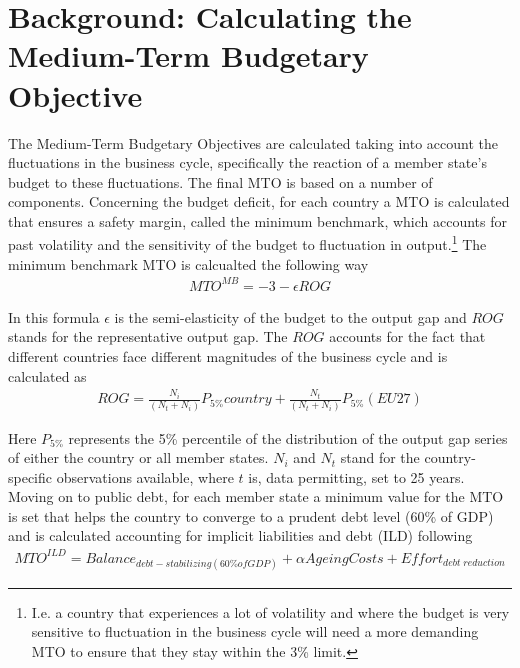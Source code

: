 \documentclass{tufte-handout}
\begin{document}
\section{Background: Calculating the Medium-Term Budgetary Objective}
The Medium-Term Budgetary Objectives are calculated taking into account the fluctuations in the business cycle, specifically the reaction of a member state's budget to these fluctuations. 
The final MTO is based on a number of components.
Concerning the budget deficit, for each country a MTO is calculated that ensures a safety margin, called the minimum benchmark, which accounts for past volatility and the sensitivity of the budget to fluctuation in output.\footnote{I.e. a country that experiences a lot of volatility and where the budget is very sensitive to fluctuation in the business cycle will need a more demanding MTO to ensure that they stay within the 3\% limit. } 
The minimum benchmark MTO is calcualted the following way
\begin{align*}
  MTO^{MB} = -3 -\epsilon ROG
\end{align*}

In this formula $\epsilon$ is the semi-elasticity of the budget to the output gap and $ROG$ stands for the representative output gap. 
The $ROG$ accounts for the fact that different countries face different magnitudes of the business cycle and is calculated as
\begin{align*}
  ROG = \frac{N_i}{(N_t+N_i)}P_{5\%}country + \frac{N_t}{(N_t+N_i)}P_{5\%}(EU27)
\end{align*}

Here $P_{5\%}$ represents the 5\% percentile of the distribution of the output gap series of either the country or all member states. 
$N_i$ and $N_t$ stand for the country-specific observations available, where $t$ is, data permitting, set to 25 years. 
Moving on to public debt, for each member state a minimum value for the MTO is set that helps the country to converge to a prudent debt level (60\% of GDP) and is calculated accounting for implicit liabilities and debt (ILD) following
\begin{align*}
  MTO^{ILD}= Balance_{debt-stabilizing(60 \% of GDP)} + \alpha AgeingCosts + Effort_{debt\;reduction}
\end{align*}
\end{document}
